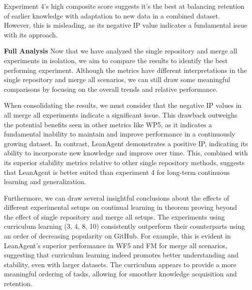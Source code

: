 \documentclass{article} %
\begin{document}
Experiment 4's high composite score suggests it's the best at balancing retention of earlier knowledge with adaptation to new data in a combined dataset. However, this is misleading, as its negative IP value indicates a fundamental issue with its approach.

\textbf{Full Analysis} Now that we have analyzed the single repository and merge all experiments in isolation, we aim to compare the results to identify the best performing experiment. Although the metrics have different interpretations in the single repository and merge all scenarios, we can still draw some meaningful comparisons by focusing on the overall trends and relative performance.

When consolidating the results, we must consider that the negative IP values in all merge all experiments indicate a significant issue. This drawback outweighs the potential benefits seen in other metrics like WP5, as it indicates a fundamental inability to maintain and improve performance in a continuously growing dataset. In contrast, LeanAgent demonstrates a positive IP, indicating its ability to incorporate new knowledge and improve over time. This, combined with its superior stability metrics relative to other single repository methods, suggests that LeanAgent is better suited than experiment 4 for long-term continuous learning and generalization.



Furthermore, we can draw several insightful conclusions about the effects of different experimental setups on continual learning in theorem proving beyond the effect of single repository and merge all setups. The experiments using curriculum learning (3, 4, 8, 10) consistently outperform their counterparts using an order of decreasing popularity on GitHub. For example, this is evident in LeanAgent's superior performance in WF5 and FM for merge all scenarios, suggesting that curriculum learning indeed promotes better understanding and stability, even with larger datasets. The curriculum appears to provide a more meaningful ordering of tasks, allowing for smoother knowledge acquisition and retention.
\end{document}
